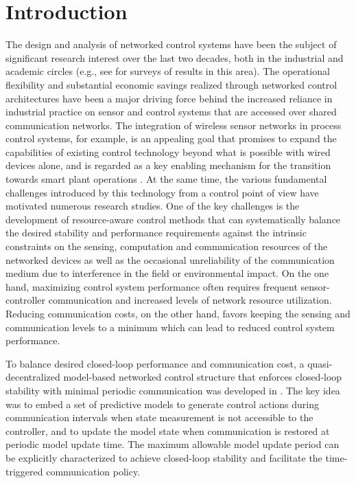 \documentclass[letterpaper, 10 pt, conference]{ieeeconf}\IEEEoverridecommandlockouts%
\begin{document}
\section{Introduction}

The design and analysis of networked control systems have been the subject of significant research interest over the last two decades, both in the industrial and academic circles (e.g., see \cite{hespanha2007survey,gupta2010networked,ke2013survey} for surveys of results in this area). The operational flexibility and substantial economic savings realized through networked control architectures have been a major driving force behind the increased reliance in industrial practice on sensor and control systems that are accessed over shared communication networks. The integration of wireless sensor networks in process control systems, for example, is an appealing goal that promises to expand the capabilities of existing control technology beyond what is possible with wired devices alone, and is regarded as a key enabling mechanism for the transition towards smart plant operations \cite{christofides2007smart}. At the same time, the various fundamental challenges introduced by this technology from a control point of view have motivated numerous research studies. One of the key challenges is the development of resource-aware control methods that can systematically balance the desired stability and performance requirements against the intrinsic constraints on the sensing, computation and communication resources of the networked devices as well as the occasional unreliability of the communication medium due to interference in the field or environmental impact. On the one hand, maximizing control system performance often requires frequent sensor-controller communication and increased levels of network resource utilization. Reducing communication costs, on the other hand, favors keeping the sensing and communication levels to a minimum which can lead to reduced control system performance.

To balance desired closed-loop performance and communication cost, a quasi-decentralized model-based networked control structure that enforces closed-loop stability with minimal periodic communication was developed in \cite{sun2008quasi}. The key idea was to embed a set of predictive models to generate control actions during communication intervals when state measurement is not accessible to the controller, and to update the model state when communication is restored at periodic model update time. The maximum allowable model update period can be explicitly characterized to achieve closed-loop stability and facilitate the time-triggered communication policy. 
\end{document}
